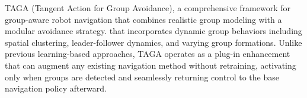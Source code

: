 

 TAGA (Tangent Action for Group Avoidance), a comprehensive framework for group-aware robot navigation that combines realistic group modeling with a modular avoidance strategy.  that incorporates dynamic group behaviors including spatial clustering, leader-follower dynamics, and varying group formations. Unlike previous learning-based approaches, TAGA operates as a plug-in enhancement that can augment any existing navigation method without retraining, activating only when groups are detected and seamlessly returning control to the base navigation policy afterward. 

    
